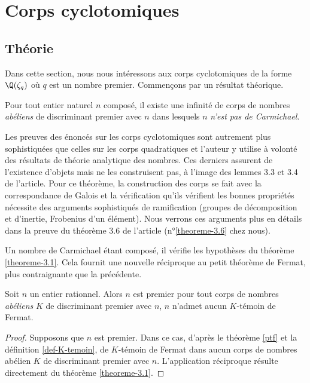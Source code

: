 \section{Corps cyclotomiques}

\subsection{Théorie}

Dans cette section, nous nous intéressons aux corps cyclotomiques de la forme $\Q(\zeta_q)$ où $q$ est un nombre premier. Commençons par un résultat théorique.

\begin{theoreme}\label{theoreme-3.1}
	Pour tout entier naturel $n$ composé, il existe une infinité de corps de nombres \emph{abéliens} de discriminant premier avec $n$ dans lesquels $n$ \emph{n'est pas de Carmichael}.
\end{theoreme}

\begin{MotSurPreuve}
	Les preuves des énoncés sur les corps cyclotomiques sont autrement plus sophistiquées que celles sur les corps quadratiques et l'auteur y utilise à volonté des résultats de théorie analytique des nombres. Ces derniers assurent de l'existence d'objets mais ne les construisent pas, à l'image des lemmes 3.3 et 3.4 de l'article. Pour ce théorème, la construction des corps se fait avec la correspondance de Galois et la vérification qu'ils vérifient les bonnes propriétés nécessite des arguments sophistiqués de ramification (groupes de décomposition et d'inertie, Frobenius d'un élément). Nous verrons ces arguments plus en détails dans la preuve du théorème 3.6 de l'article (n°\ref{theoreme-3.6} chez nous). \\
\end{MotSurPreuve}

Un nombre de Carmichael étant composé, il vérifie les hypothèses du théorème \ref{theoreme-3.1}. Cela fournit une nouvelle réciproque au petit théorème de Fermat, plus contraignante que la précédente.

\begin{theoreme}\label{reciproque-2}
	Soit $n$ un entier rationnel. Alors $n$ est premier \ssi pour tout corps de nombres \emph{abéliens} $K$ de discriminant premier avec $n$, $n$ n'admet aucun $K$-témoin de Fermat.
\end{theoreme}

\begin{proof}
	Supposons que $n$ est premier. Dans ce cas, d'après le théorème \ref{ptf} et la définition \ref{def-K-temoin}, de $K$-témoin de Fermat dans aucun corps de nombres abélien $K$ de discriminant premier avec $n$. L'application réciproque résulte directement du théorème \ref{theoreme-3.1}.
\end{proof}

